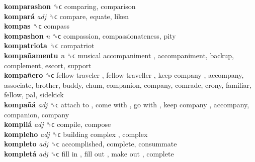 \textbf{komparashon} ␝ϲ  comparing, comparison  \\
\textbf{kompará} \emph{adj}  ␝ϲ  compare, equate, liken  \\
\textbf{kompas} ␝ϲ  compass  \\
\textbf{kompashon} \emph{n}  ␝ϲ  compassion, compassionateness, pity  \\
\textbf{kompatriota} ␝ϲ  compatriot  \\
\textbf{kompañamentu} \emph{n}  ␝ϲ   musical accompaniment , accompaniment, backup, complement, escort, support  \\
\textbf{kompañero} ␝ϲ   fellow traveler ,  fellow traveller ,  keep company , accompany, associate, brother, buddy, chum, companion, company, comrade, crony, familiar, fellow, pal, sidekick  \\
\textbf{kompañá} \emph{adj}  ␝ϲ   attach to ,  come with ,  go with ,  keep company , accompany, companion, company  \\
\textbf{kompilá} \emph{adj}  ␝ϲ  compile, compose  \\
\textbf{kompleho} \emph{adj}  ␝ϲ   building complex , complex  \\
\textbf{kompleto} \emph{adj}  ␝ϲ  accomplished, complete, consummate  \\
\textbf{kompletá} \emph{adj}  ␝ϲ   fill in ,  fill out ,  make out , complete  \\
